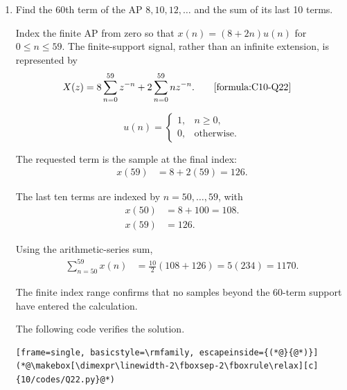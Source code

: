 \begin{enumerate}[label=\thesubsection.\arabic*, ref=\thesubsection.\theenumi]
    The following code verifies the solution.

    \begin{lstlisting}[frame=single, basicstyle=\rmfamily, escapeinside={(*@}{@*)}]
(*@\makebox[\dimexpr\linewidth-2\fboxsep-2\fboxrule\relax][c]{10/codes/Q15.py}@*)
    \end{lstlisting}


    \item
    \label{question:C10-Q22}
    \label{question-short:C10-Q22} Find the 60th term of the AP $8,10,12,\ldots$ and the sum of its last 10 terms.

    \par
    \smallskip
    \solution

    Index the finite AP from zero so that $x(n)=(8+2n)u(n)$ for $0\le n\le59$. The finite-support signal, rather than an infinite extension, is represented by
    \begin{align*}
        X(z) & =8\sum_{n=0}^{59}z^{-n}+2\sum_{n=0}^{59}nz^{-n}.
	    \tag*{\eqref{formula:C10-Q22}}
    \end{align*}

    \[
u(n) =
\begin{cases}
1, & n \geq 0,\\
0, & \text{otherwise}.
\end{cases}
\]

    The requested term is the sample at the final index:
    \begin{align*}
	    x(59) & =8+2(59)=126.
    \end{align*}

    The last ten terms are indexed by $n=50,\ldots,59$, with
    \begin{align*}
	    x(50) & =8+100=108. \\
	    x(59) & =126.
    \end{align*}

    Using the arithmetic-series sum,
    \begin{align*}
	    \sum_{n=50}^{59}x(n) & =\frac{10}{2}(108+126)=5(234)=1170.
    \end{align*}

    The finite index range confirms that no samples beyond the 60-term support have entered the calculation.

    The following code verifies the solution.

    \begin{lstlisting}[frame=single, basicstyle=\rmfamily, escapeinside={(*@}{@*)}]
(*@\makebox[\dimexpr\linewidth-2\fboxsep-2\fboxrule\relax][c]{10/codes/Q22.py}@*)
    \end{lstlisting}



\end{enumerate}
